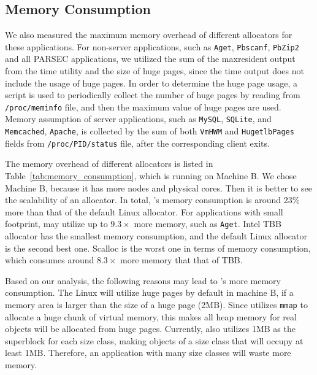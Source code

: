\subsection{Memory Consumption}
\label{sec:memory}

We also measured the maximum memory overhead of different allocators for these applications. For non-server applications, such as \texttt{Aget}, \texttt{Pbscanf}, \texttt{PbZip2} and all PARSEC applications, we utilized the sum of the maxresident output from the time utility and the size of huge pages, since the time output does not include the usage of huge pages. In order to determine the huge page usage, a script is used to periodically collect the number of huge pages by reading from \texttt{/proc/meminfo} file, and then the maximum value of huge pages are used. Memory assumption of server applications, such as \texttt{MySQL}, \texttt{SQLite}, and \texttt{Memcached}, \texttt{Apache}, is collected by the sum of both \texttt{VmHWM} and \texttt{HugetlbPages} fields from \texttt{/proc/PID/status} file, after the corresponding client exits. 




The memory overhead of different allocators is listed in Table~\ref{tab:memory_consumption}, which is running on Machine B. We chose Machine B, because it has more nodes and physical cores. Then it is better to see the scalability of an allocator. In total, \NM{}'s memory consumption is around 23\% more than that of the default Linux allocator. For applications with small footprint, \NM{} may utilize up to $9.3\times$ more memory, such as \texttt{Aget}. Intel TBB allocator has the smallest memory consumption, and the default Linux allocator is the second best one. Scalloc is the worst one in terms of memory consumption, which consumes around  $8.3\times$ more memory that that of TBB.  
 
 Based on our analysis, the following reasons may lead to \NM{}'s more memory consumption. The Linux will utilize huge pages by default in machine B, if a memory area is larger than the size of a huge page (2MB). Since \NM{} utilizes \texttt{mmap} to allocate a huge chunk of virtual memory, this makes all heap memory for real objects will be allocated from huge pages. Currently, \NM{} also utilizes 1MB as the superblock for each size class, making objects of a size class that will occupy at least 1MB. Therefore, an application with many size classes will waste more memory.  
 
